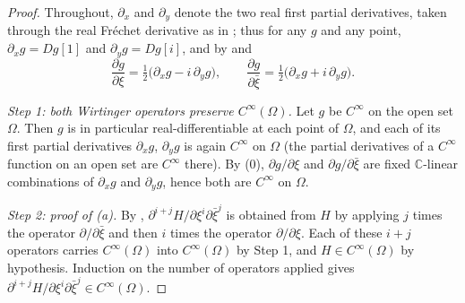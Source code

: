 \begin{proof}
Throughout, $\partial_x$ and $\partial_y$ denote the two real first partial
derivatives, taken through the real Fr\'echet derivative as in ;
thus for any $g$ and any point, $\partial_xg=Dg[1]$ and $\partial_yg=Dg[i]$,
and by  and 
\begin{equation}\tag{0}
  \frac{\partial g}{\partial\xi}=\tfrac12\bigl(\partial_xg-i\,\partial_yg\bigr),
  \qquad
  \frac{\partial g}{\partial\bar\xi}=\tfrac12\bigl(\partial_xg+i\,\partial_yg\bigr).
\end{equation}

\emph{Step 1: both Wirtinger operators preserve $C^\infty(\Omega)$.}  Let $g$ be
$C^\infty$ on the open set $\Omega$.  Then $g$ is in particular
real-differentiable at each point of $\Omega$, and each of its first partial
derivatives $\partial_xg$, $\partial_yg$ is again $C^\infty$ on $\Omega$ (the
partial derivatives of a $C^\infty$ function on an open set are $C^\infty$
there).  By (0), $\partial g/\partial\xi$ and $\partial g/\partial\bar\xi$ are
fixed $\mathbb{C}$-linear combinations of $\partial_xg$ and $\partial_yg$, hence
both are $C^\infty$ on $\Omega$.

\emph{Step 2: proof of (a).}  By ,
$\partial^{i+j}H/\partial\xi^i\partial\bar\xi^j$ is obtained from $H$ by
applying $j$ times the operator $\partial/\partial\bar\xi$ and then $i$ times
the operator $\partial/\partial\xi$.  Each of these $i+j$ operators carries
$C^\infty(\Omega)$ into $C^\infty(\Omega)$ by Step 1, and $H\in C^\infty(\Omega)$
by hypothesis.  Induction on the number of operators applied gives
$\partial^{i+j}H/\partial\xi^i\partial\bar\xi^j\in C^\infty(\Omega)$.


\end{proof}
